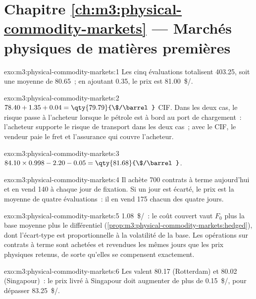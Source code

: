 \section*{Chapitre \ref{ch:m3:physical-commodity-markets} --- Marchés physiques de matières premières}

\begin{solution}{exo:m3:physical-commodity-markets:1}
Les cinq évaluations totalisent 403.25, soit une moyenne de 80.65~; en ajoutant 0.35, le prix est
\qty{81.00}{\$/\barrel}.
\end{solution}

\begin{solution}{exo:m3:physical-commodity-markets:2}
$78.40 + 1.35 + 0.04 = \qty{79.79}{\$/\barrel}$ CIF. Dans les deux cas, le risque
passe à l'acheteur lorsque le pétrole est à bord au port de chargement~: l'acheteur supporte
le risque de transport dans les deux cas~; avec le CIF, le vendeur paie le fret et
l'assurance qui couvre l'acheteur.
\end{solution}

\begin{solution}{exo:m3:physical-commodity-markets:3}
$84.10 \times 0.998 - 2.20 - 0.05 = \qty{81.68}{\$/\barrel}$.
\end{solution}

\begin{solution}{exo:m3:physical-commodity-markets:4}
Il achète 700 contrats à terme aujourd'hui et en vend 140 à chaque jour de fixation. Si un jour est écarté, le
prix est la moyenne de quatre évaluations~: il en vend 175 chacun des quatre jours.
\end{solution}

\begin{solution}{exo:m3:physical-commodity-markets:5}
\qty{1.08}{\$/\barrel}~: le coût couvert vaut $F_0$ plus la base moyenne plus le
différentiel (\cref{prop:m3:physical-commodity-markets:hedged}), dont l'écart-type
est proportionnelle à la volatilité de la base. Les opérations sur contrats à terme sont achetées et
revendues les mêmes jours que les prix physiques retenus, de sorte qu'elles se compensent exactement.
\end{solution}

\begin{solution}{exo:m3:physical-commodity-markets:6}
Les  valent 80.17 (Rotterdam) et 80.02 (Singapour)~: le prix livré à Singapour
doit augmenter de plus de \qty{0.15}{\$/\barrel}, pour dépasser
\qty{83.25}{\$/\barrel}.
\end{solution}

